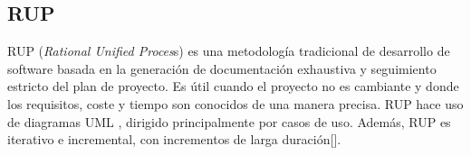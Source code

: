 %
%

%

\subsection{RUP}

RUP (\textit{Rational Unified Proces}s) es una metodología tradicional de desarrollo de software basada en la generación de documentación exhaustiva y seguimiento estricto del plan de proyecto. Es útil cuando el proyecto no es cambiante y donde los requisitos, coste y tiempo son conocidos de una manera precisa. RUP hace uso de diagramas UML , dirigido principalmente por casos de uso. Además, RUP es iterativo e incremental, con incrementos de larga duración[\cite{93}].

